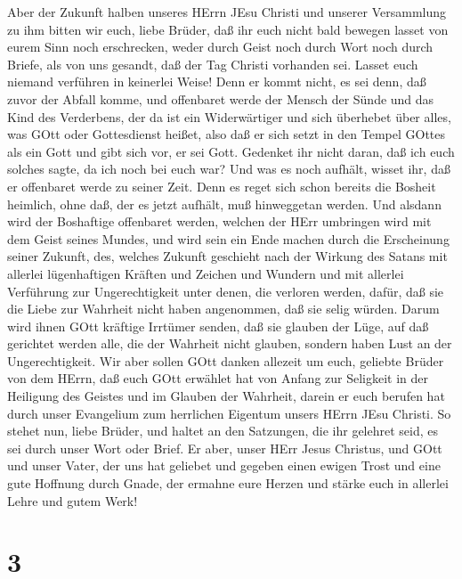  Aber der Zukunft halben unseres HErrn JEsu Christi und
unserer Versammlung zu ihm bitten wir euch, liebe Brüder, 
daß ihr euch nicht bald bewegen lasset von eurem Sinn noch erschrecken,
weder durch Geist noch durch Wort noch durch Briefe, als von uns
gesandt, daß der Tag Christi vorhanden sei.  Lasset euch
niemand verführen in keinerlei Weise! Denn er kommt nicht, es sei denn,
daß zuvor der Abfall komme, und offenbaret werde der Mensch der Sünde
und das Kind des Verderbens,  der da ist ein Widerwärtiger
und sich überhebet über alles, was GOtt oder Gottesdienst heißet, also
daß er sich setzt in den Tempel GOttes als ein Gott und gibt sich vor,
er sei Gott.  Gedenket ihr nicht daran, daß ich euch solches
sagte, da ich noch bei euch war?  Und was es noch aufhält,
wisset ihr, daß er offenbaret werde zu seiner Zeit.  Denn es
reget sich schon bereits die Bosheit heimlich, ohne daß, der es jetzt
aufhält, muß hinweggetan werden.  Und alsdann wird der
Boshaftige offenbaret werden, welchen der HErr umbringen wird mit dem
Geist seines Mundes, und wird sein ein Ende machen durch die Erscheinung
seiner Zukunft,  des, welches Zukunft geschieht nach der
Wirkung des Satans mit allerlei lügenhaftigen Kräften und Zeichen und
Wundern  und mit allerlei Verführung zur Ungerechtigkeit
unter denen, die verloren werden, dafür, daß sie die Liebe zur Wahrheit
nicht haben angenommen, daß sie selig würden.  Darum wird
ihnen GOtt kräftige Irrtümer senden, daß sie glauben der Lüge,
 auf daß gerichtet werden alle, die der Wahrheit nicht
glauben, sondern haben Lust an der Ungerechtigkeit.  Wir
aber sollen GOtt danken allezeit um euch, geliebte Brüder von dem HErrn,
daß euch GOtt erwählet hat von Anfang zur Seligkeit in der Heiligung des
Geistes und im Glauben der Wahrheit,  darein er euch
berufen hat durch unser Evangelium zum herrlichen Eigentum unsers HErrn
JEsu Christi.  So stehet nun, liebe Brüder, und haltet an
den Satzungen, die ihr gelehret seid, es sei durch unser Wort oder
Brief.  Er aber, unser HErr Jesus Christus, und GOtt und
unser Vater, der uns hat geliebet und gegeben einen ewigen Trost und
eine gute Hoffnung durch Gnade,  der ermahne eure Herzen
und stärke euch in allerlei Lehre und gutem Werk!

\hypertarget{section-2}{%
\section{3}\label{section-2}}

